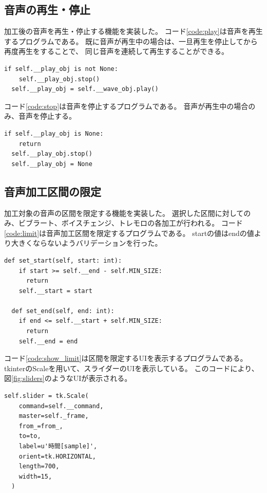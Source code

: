 \documentclass[a4paper,11pt]{jsarticle}
\begin{document}
\subsection{音声の再生・停止}

加工後の音声を再生・停止する機能を実装した。
コード\ref{code:play}は音声を再生するプログラムである。
既に音声が再生中の場合は、一旦再生を停止してから再度再生をすることで、
同じ音声を連続して再生することができる。

\begin{lstlisting}[caption=音声再生,label=code:play]
  if self.__play_obj is not None:
    self.__play_obj.stop()
  self.__play_obj = self.__wave_obj.play()
\end{lstlisting}

コード\ref{code:stop}は音声を停止するプログラムである。
音声が再生中の場合のみ、音声を停止する。

\begin{lstlisting}[caption=音声停止,label=code:stop]
  if self.__play_obj is None:
    return
  self.__play_obj.stop()
  self.__play_obj = None

\end{lstlisting}

\subsection{音声加工区間の限定}

加工対象の音声の区間を限定する機能を実装した。
選択した区間に対してのみ、ビブラート、ボイスチェンジ、トレモロの各加工が行われる。
コード\ref{code:limit}は音声加工区間を限定するプログラムである。
startの値はendの値より大きくならないようバリデーションを行った。

\begin{lstlisting}[caption=音声加工区間の限定,label=code:limit]
  def set_start(self, start: int):
    if start >= self.__end - self.MIN_SIZE:
      return
    self.__start = start

  def set_end(self, end: int):
    if end <= self.__start + self.MIN_SIZE:
      return
    self.__end = end
\end{lstlisting}

コード\ref{code:show_limit}は区間を限定するUIを表示するプログラムである。
tkinterのScaleを用いて、スライダーのUIを表示している。
このコードにより、図\ref{fig:sliders}のようなUIが表示される。

\begin{lstlisting}[caption=区間を限定するUI,label=code:show_limit]
  self.slider = tk.Scale(
    command=self.__command,
    master=self._frame,
    from_=from_,
    to=to,
    label=u'時間[sample]',
    orient=tk.HORIZONTAL,
    length=700,
    width=15,
  )
\end{lstlisting}
\end{document}
